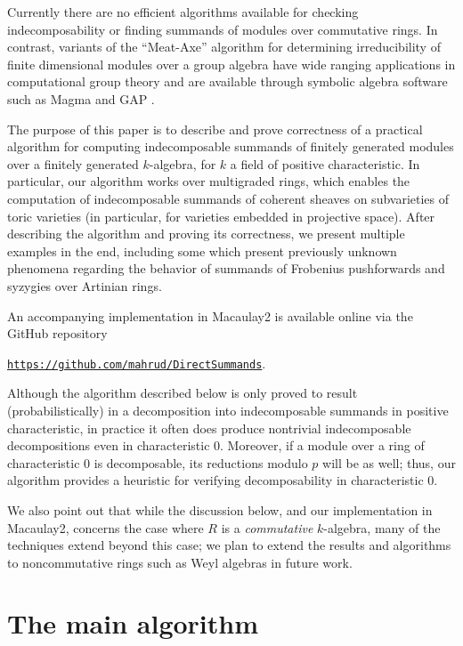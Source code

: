 \documentclass{article}
\numberwithin{equation}{section}
\theoremstyle{theorem}
\numberwithin{thm}{section}
\theoremstyle{definition}
\begin{document}
Currently there are no efficient algorithms available for checking indecomposability or finding summands of modules over commutative rings. In contrast, variants of the ``Meat-Axe'' algorithm for determining irreducibility of finite dimensional modules over a group algebra have wide ranging applications in computational group theory \cite{Parker84,HR94,Holt98} and are available through symbolic algebra software such as Magma and GAP \cite{MAGMA,GAP}.

The purpose of this paper is to describe and prove correctness of a practical algorithm for computing indecomposable summands of finitely generated modules over a finitely generated $k$-algebra, for $k$ a field of positive characteristic.
In particular, our algorithm works over multigraded rings, which enables the computation of indecomposable summands of coherent sheaves on subvarieties of toric varieties (in particular, for varieties embedded in projective space).
After describing the algorithm and proving its correctness, we present multiple examples in the end, including some which present previously unknown phenomena regarding the behavior of summands of Frobenius pushforwards and syzygies over Artinian rings.

An accompanying implementation in Macaulay2 is available online via the GitHub repository 
\centerline{
  \href{https://github.com/mahrud/DirectSummands}
  {\texttt{https://github.com/mahrud/DirectSummands}}.}


\begin{rem}
  Although the algorithm described below is only proved to result (probabilistically) in a decomposition into indecomposable summands in positive characteristic, in practice it often does produce nontrivial indecomposable decompositions even in characteristic 0. Moreover, if a module over a ring of characteristic 0 is decomposable, its reductions modulo $p$ will be as well; thus, our algorithm provides a heuristic for verifying decomposability in characteristic 0. 

  We also point out that while the discussion below, and our implementation in Macaulay2, concerns the case where $R$ is a \emph{commutative} $k$-algebra, many of the techniques extend beyond this case; we plan to extend the results and algorithms to noncommutative rings such as Weyl algebras in future work.
\end{rem}

\section{The main algorithm}
\end{document}

